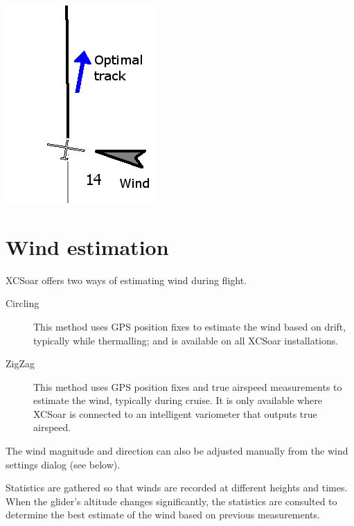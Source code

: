 \documentclass[a4paper,12pt]{refrep}
\begin{document}
\begin{center}
\includegraphics[angle=0,width=0.5\linewidth,keepaspectratio='true']{figures/optwind.png}


\end{center}

\section{Wind estimation}\label{sec:wind-estimation}

XCSoar offers two ways of estimating wind during flight.
\begin{description}
\item[Circling]  This method uses GPS position fixes to estimate the wind
  based on drift, typically while thermalling; and is available on all
  XCSoar installations.
\item[ZigZag]  This method uses GPS position fixes and true airspeed measurements
  to estimate the wind, typically during cruise.  It is only available where
  XCSoar is connected to an intelligent variometer that outputs true airspeed.
\end{description}

The wind magnitude and direction can also be adjusted manually from the
wind settings dialog (see below).  

Statistics are gathered so that winds are recorded at different
heights and times.  When the glider's altitude changes significantly,
the statistics are consulted to determine the best estimate of the
wind based on previous measurements.
\end{document}
